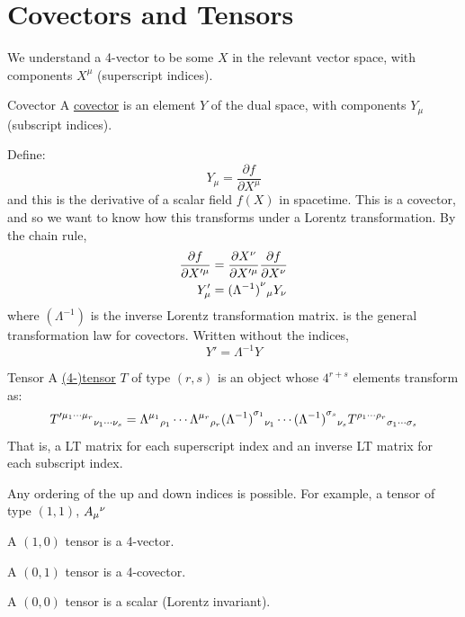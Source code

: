 \documentclass[../Main.tex]{subfiles}
\begin{document}
\section{Covectors and Tensors}
We understand a 4-vector to be some $X$ in the relevant vector space, with components $X^\mu$ (superscript indices).
\begin{definition}{Covector}
    A \underline{covector} is an element $Y$ of the dual space, with components $Y_\mu$ (subscript indices).
\end{definition}
Define:
\begin{equation*}
    Y_\mu = \frac{\partial f}{\partial X^\mu}
\end{equation*}
and this is the derivative of a scalar field $f(X)$ in spacetime. This is a covector, and so we want to know how this transforms under a Lorentz transformation. By the chain rule,
\begin{align}
    \frac{\partial f}{\partial X^{\prime \mu}} &= \frac{\partial X^\nu}{\partial X^{\prime \mu}} \frac{\partial f}{\partial X^\nu} \nonumber \\
    Y_\mu' &= \indx{(\Lambda^{-1})}{\nu}{\mu} Y_\nu \label{eqnLorentzTransformDerivative}
\end{align}
where $(\Lambda^{-1})$ is the inverse Lorentz transformation matrix.  is the general transformation law for covectors. Written without the indices,
\begin{equation*}
    Y' = \Lambda^{-1} Y
\end{equation*}
\begin{definition}{Tensor}
    A \underline{(4-)tensor} $T$ of type $(r, s)$ is an object whose $4^{r+s}$ elements transform as:
    \begin{equation}
        \indx{T}{\prime \mu_1 \cdots \mu_r}{\nu_1 \cdots \nu_s} = \indx{\Lambda}{\mu_1}{\rho_1} \cdots \indx{\Lambda}{\mu_r}{\rho_r} \indx{(\Lambda^{-1})}{\sigma_1}{\nu_1} \cdots \indx{(\Lambda^{-1})}{\sigma_s}{\nu_s} \indx{T}{\rho_1 \cdots \rho_r}{\sigma_1\cdots\sigma_s}
        \label{eqnLorentzTransformTensor}
    \end{equation}
    That is, a LT matrix for each superscript index and an inverse LT matrix for each subscript index.
\end{definition}
\begin{remarks}
    \item Any ordering of the up and down indices is possible. For example, a tensor of type $(1, 1)$, $A_\mu\hphantom{}^\nu$
    \item A $(1, 0)$ tensor is a 4-vector.
    \item A $(0, 1)$ tensor is a 4-covector.
    \item A $(0, 0)$ tensor is a scalar (Lorentz invariant).
\end{remarks}
\end{document}
